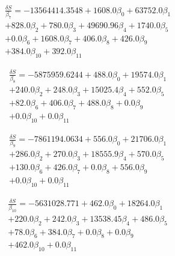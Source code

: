 \documentclass[letterpaper, 10 pt, conference]{ieeeconf}
\begin{document}
\begin{equation}
\begin{split}
\frac{\delta S}{\beta_7} = -13564414.3548+1608.0\beta_0+63752.0\beta_1\\
                        +828.0\beta_2+780.0\beta_3+49690.96\beta_4+1740.0\beta_5\\
                        +0.0\beta_6+1608.0\beta_7+406.0\beta_8+426.0\beta_9\\
                        +384.0\beta_{10}+392.0\beta_{11}
\end{split}
\end{equation}


\begin{equation}
\begin{split}
\frac{\delta S}{\beta_8} = -5875959.6244+488.0\beta_0+19574.0\beta_1\\
                        +240.0\beta_2+248.0\beta_3+15025.4\beta_4+552.0\beta_5\\
                        +82.0\beta_6+406.0\beta_7+488.0\beta_8+0.0\beta_9\\
                        +0.0\beta_{10}+0.0\beta_{11}
\end{split}
\end{equation}

\begin{equation}
\begin{split}
\frac{\delta S}{\beta_9} = -7861194.0634+556.0\beta_0+21706.0\beta_1\\
                        +286.0\beta_2+270.0\beta_3+18555.9\beta_4+570.0\beta_5\\
                        +130.0\beta_6+426.0\beta_7+0.0\beta_8+556.0\beta_9\\
                        +0.0\beta_{10}+0.0\beta_{11}
\end{split}
\end{equation}

\begin{equation}
\begin{split}
\frac{\delta S}{\beta_{10}} = -5631028.771+462.0\beta_0+18264.0\beta_1\\
                        +220.0\beta_2+242.0\beta_3+13538.45\beta_4+486.0\beta_5\\
                        +78.0\beta_6+384.0\beta_7+0.0\beta_8+0.0\beta_9\\
                        +462.0\beta_{10}+0.0\beta_{11}
\end{split}
\end{equation}
\end{document}
